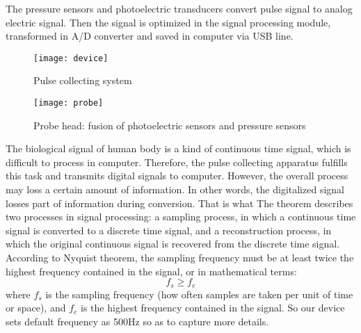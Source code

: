 The pressure sensors and photoelectric transducers convert pulse
signal to analog electric signal. Then the signal is optimized in the
signal processing module, transformed in A/D converter and saved in
computer via USB line. 
\begin{figure}[htbp]
    \centering
    \texttt{[image: device]}
    \caption{Pulse collecting system}
    \label{fig:device}
\end{figure}
\begin{figure}[htbp]
    \centering
    \texttt{[image: probe]}
    \caption{Probe head: fusion of photoelectric sensors and pressure sensors}
    \label{fig:probe}
\end{figure}
The biological signal of human body is a kind of continuous time
signal, which is difficult to process in computer. Therefore, the
pulse collecting apparatus fulfills this task and transmits
digital signals to computer. However, the overall process may loss a
certain amount of information. In other words, the digitalized signal
losses part of information during conversion. That is what 
The theorem describes two processes in signal processing: a sampling
process, in which a continuous time signal is converted to a discrete
time signal, and a reconstruction process, in which the original
continuous signal is recovered from the discrete time signal.
According to Nyquist theorem, the sampling frequency must be at least 
twice the highest frequency contained in the signal, or in
mathematical terms:
\begin{equation}
    f_s \geq f_e
    \label{eq:nyquist}
\end{equation}
where $f_s$ is the sampling frequency (how often samples are taken per
unit of time or space), and $f_e$ is the highest frequency contained
in the signal. So our device sets default frequency as 500Hz so as to
capture more details.  

